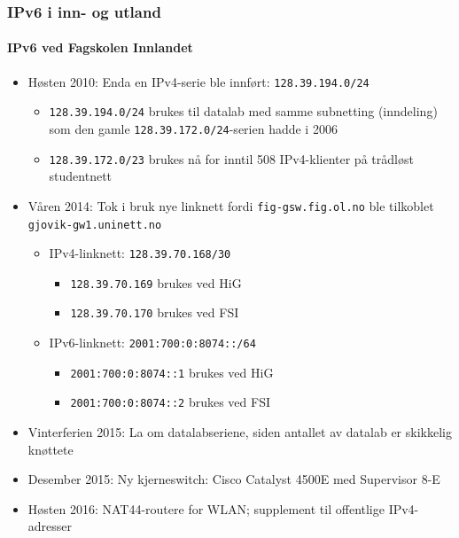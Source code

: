 \begin{frame}
  \frametitle{IPv6 i inn- og utland}
  \framesubtitle{IPv6 ved Fagskolen Innlandet}
  \begin{itemize}
  \item Høsten 2010: Enda en IPv4-serie ble innført:
    \texttt{128.39.194.0/24}
    \begin{itemize}
    \item \texttt{128.39.194.0/24} brukes til datalab med samme
      subnetting (inndeling) som den gamle
      \texttt{128.39.172.0/24}-serien hadde i 2006
    \item \texttt{128.39.172.0/\alert{23}} brukes nå for inntil 508
      IPv4-klienter på trådløst studentnett
    \end{itemize}
  \item Våren 2014: Tok i bruk nye linknett fordi
    \texttt{fig-gsw.fig.ol.no} ble tilkoblet
    \texttt{gjovik-gw1.uninett.no}
    \begin{itemize}
    \item IPv4-linknett: \texttt{128.39.70.168/30}
      \begin{itemize}
      \item \texttt{128.39.70.169} brukes ved HiG
      \item \texttt{128.39.70.170} brukes ved FSI
      \end{itemize}
    \item IPv6-linknett: \texttt{2001:700:0:8074::/64}
      \begin{itemize}
      \item \texttt{2001:700:0:8074::1} brukes ved HiG
      \item \texttt{2001:700:0:8074::2} brukes ved FSI
      \end{itemize}
    \end{itemize}
  \item Vinterferien 2015: La om datalabseriene, siden antallet av datalab
    er skikkelig knøttete
  \item Desember 2015: Ny kjerneswitch: Cisco Catalyst 4500E med Supervisor 8-E
  \item Høsten 2016: NAT44-routere for WLAN; supplement til offentlige
    IPv4-adresser
  \end{itemize}
\end{frame}

